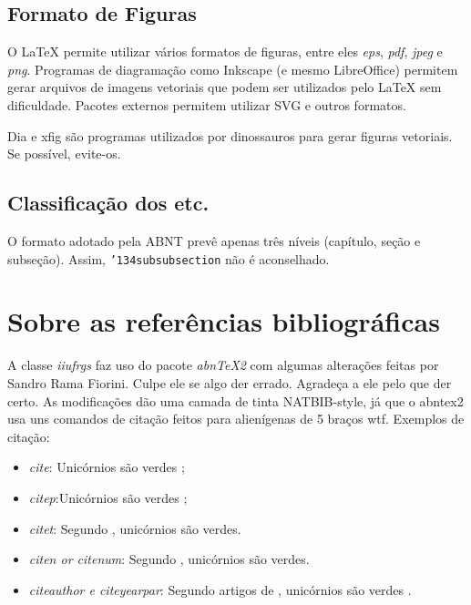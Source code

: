 \documentclass[ppgc,ti]{iiufrgs}
\begin{document}
\subsection{Formato de Figuras}
\label{sec:fig_format}

O LaTeX permite utilizar vários formatos de figuras, entre eles \emph{eps}, \emph{pdf}, \emph{jpeg} e \emph{png}. Programas de diagramação como Inkscape (e mesmo LibreOffice) permitem gerar arquivos de imagens vetoriais que podem ser utilizados pelo LaTeX sem dificuldade. Pacotes externos permitem utilizar SVG e outros formatos.

Dia e xfig são programas utilizados por dinossauros para gerar figuras vetoriais. Se possível, evite-os.

\subsection{Classificação dos etc.}

O formato adotado pela ABNT prevê apenas três níveis (capítulo, seção e subseção). Assim, \texttt{\char'134subsubsection} não é aconselhado.

\section{Sobre as referências bibliográficas}

A classe \emph{iiufrgs} faz uso do pacote \emph{abnTeX2} com algumas alterações
feitas por Sandro Rama Fiorini. Culpe ele se algo der errado. Agradeça a ele
pelo que der certo. As modificações dão uma camada de tinta NATBIB-style,
já que o abntex2 usa uns comandos de citação feitos para alienígenas de 5 braços
wtf. Exemplos de citação:

\begin{itemize}
    \item \emph{cite}: Unicórnios são verdes \cite{Adams2009Conceptual};
    \item \emph{citep}:Unicórnios são verdes \citep{Adams2009Conceptual};
    \item \emph{citet}: Segundo \citet{Adams2009Conceptual}, unicórnios são
                        verdes.
    \item \emph{citen or citenum}: Segundo ,
        unicórnios são verdes.
    \item \emph{citeauthor e citeyearpar}: Segundo artigos de
        \citeauthor{Adams2009Conceptual} , unicórnios são verdes
        \citeyearpar{Adams2009Conceptual}.

\end{itemize}
\end{document}
